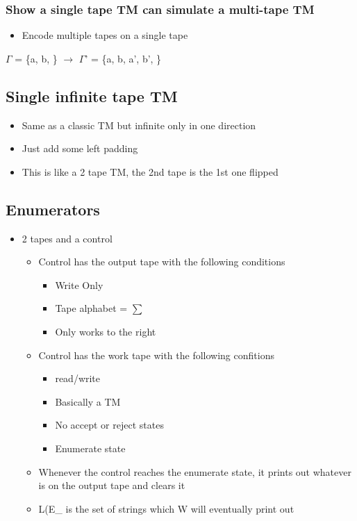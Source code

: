 \documentclass[11pt]{article}
\begin{document}
\subsubsection{Show a single tape TM can simulate a multi-tape TM}
\label{sec:orgbb24988}
\begin{itemize}
\item Encode multiple tapes on a single tape
\end{itemize}
\(\Gamma\) = \{a, b, \Box\} \(\rightarrow\) \(\Gamma\)' = \{a, b, a', b', \Box\}
\subsection{Single infinite tape TM}
\label{sec:org038b3e8}
\begin{itemize}
\item Same as a classic TM but infinite only in one direction
\item Just add some left padding
\item This is like a 2 tape TM, the 2nd tape is the 1st one flipped
\end{itemize}
\subsection{Enumerators}
\label{sec:orgfb2a7a1}
\begin{itemize}
\item 2 tapes and a control
\begin{itemize}
\item Control has the output tape with the following conditions
\begin{itemize}
\item Write Only
\item Tape alphabet = \(\sum\)
\item Only works to the right
\end{itemize}
\item Control has the work tape with the following confitions
\begin{itemize}
\item read/write
\item Basically a TM
\item No accept or reject states
\item Enumerate state
\end{itemize}
\end{itemize}
\begin{itemize}
\item Whenever the control reaches the enumerate state, it prints out whatever is on the output tape and clears it
\item L(E\_ is the set of strings which W will eventually print out
\end{itemize}
\end{itemize}
\end{document}
